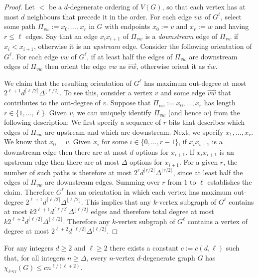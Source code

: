 \documentclass{patmorin}
\newcommand{\defin}[1]{\emph{\color{brightmaroon}#1}}
\newcommand{\rn}[1]{\chi_{\operatorname{#1-vr}}}
\newcommand{\lrn}{\rn{\ell}}
\begin{document}
\begin{proof}
  Let $<$ be a $d$-degenerate ordering of $V(G)$, so that each vertex has at most $d$ neighbours that precede it in the order.  For each edge $vw$ of $G^{\ell}$, select some path $\Pi_{vw}:=x_0,\ldots,x_r$ in $G$ with endpoints $x_0:=v$ and $x_r:=w$ and having $r\le\ell$ edges.  Say that an edge $x_ix_{i+1}$ of $\Pi_{vw}$ is a \defin{downstream} edge of $\Pi_{vw}$ if $x_i < x_{i+1}$, otherwise it is an \defin{upstream} edge.  Consider the following orientation of $G^\ell$.  For each edge $vw$ of $G^\ell$, if at least half the edges of $\Pi_{vw}$ are downstream edges of $\Pi_{vw}$ then orient the edge $vw$ as $\overrightarrow{vw}$, otherwise orient it as $\overleftarrow{vw}$.

  We claim that the resulting orientation of $G^{\ell}$ has maximum out-degree at most $2^{\ell+1} d^{\lceil\ell/2\rceil}\Delta^{\lfloor\ell/2\rfloor}$.  To see this, consider a vertex $v$ and some edge $\overrightarrow{vw}$ that contributes to the out-degree of $v$.  Suppose that $\Pi_{vw}:=x_0,\ldots,x_r$ has length $r\in\{1,\ldots,\ell\}$. Given $v$, we can uniquely identify $\Pi_{vw}$ (and hence $w$) from the following description: We first specify a sequence of $r$ bits that describes which edges of $\Pi_{vw}$ are upstream and which are downstream.  Next, we specify $x_1,\ldots,x_r$.  We know that $x_0=v$. Given $x_i$ for some $i\in\{0,\ldots,r-1\}$, if $x_ix_{i+1}$ is a downstream edge then there are at most $d$ options for $x_{i+1}$.  If $x_ix_{i+1}$ is an upstream edge then there are at most $\Delta$ options for $x_{i+1}$.  For a given $r$, the number of such paths is therefore at most $2^rd^{\lceil r/2\rceil}\Delta^{\lfloor r/2\rfloor}$, since at least half the edges of $\Pi_{vw}$ are downstream edges.  Summing over $r$ from $1$ to $\ell$ establishes the claim.  Therefore $G^{\ell}$ has an orientation in which each vertex has maximum out-degree $2^{\ell+1} d^{\lceil\ell/2\rceil}\Delta^{\lfloor\ell/2\rfloor}$. This implies that any $k$-vertex subgraph of $G^\ell$ contains at most $k2^{\ell+1} d^{\lceil\ell/2\rceil}\Delta^{\lfloor\ell/2\rfloor}$ edges and therefore total degree at most $k2^{\ell+2} d^{\lceil\ell/2\rceil}\Delta^{\lfloor\ell/2\rfloor}$.  Therefore any $k$-vertex subgraph of $G^\ell$ contains a vertex of degree at most $2^{\ell+2} d^{\lceil\ell/2\rceil}\Delta^{\lfloor\ell/2\rfloor}$.
\end{proof}

\begin{thm}\label{l_degenerate}
  For any integers $d\ge 2$ and $\ell\ge 2$ there exists a constant $c:=c(d,\ell)$ such that, for all integers $n\ge \Delta$, every $n$-vertex $d$-degenerate graph $G$ has $\lrn(G)\le cn^{\ell/(\ell+2)}$.
\end{thm}
\end{document}
